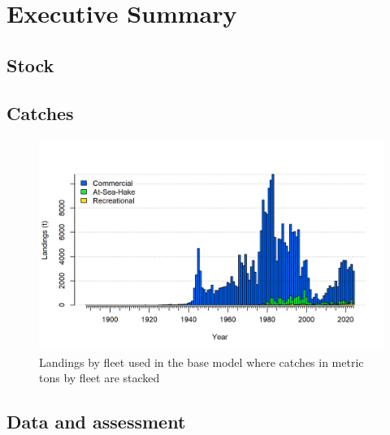 \documentclass[
]{scrartcl}
\begin{document}
\newpage{}

\hypertarget{executive-summary}{%
\section*{Executive Summary}\label{executive-summary}}

\hypertarget{stock}{%
\subsection*{Stock}\label{stock}}

\hypertarget{catches}{%
\subsection*{Catches}\label{catches}}

\clearpage



\begin{figure}

{\centering \includegraphics[width=6in,height=\textheight]{r4ss_plots/catch2_landings_stacked.png}

}

\caption{\label{fig-es-catch}Landings by fleet used in the base model
where catches in metric tons by fleet are stacked}

\end{figure}

\clearpage

\hypertarget{data-and-assessment}{%
\subsection*{Data and assessment}\label{data-and-assessment}}
\end{document}
